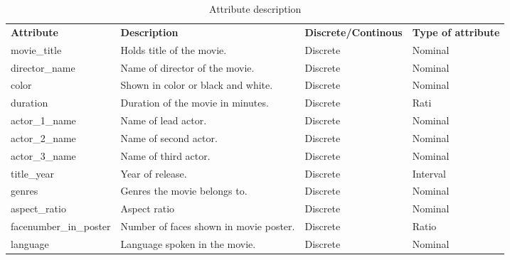 \documentclass[11pt]{article}
\begin{document}
\begin{sidewaystable}
\centering
\caption{Attribute description}
\label{my-label}
\begin{tabular}{llll}
\textbf{Attribute}           & \textbf{Description}                                  & \textbf{Discrete/Continous} & \textbf{Type of attribute} \\
movie\_title                 & Holds title of the movie.                             & Discrete                    & Nominal                    \\
director\_name               & Name of director of the movie.                        & Discrete                    & Nominal                    \\
color                        & Shown in color or black and white.                    & Discrete                    & Nominal                    \\
duration                     & Duration of the movie in minutes.                     & Discrete                    & Rati                       \\
actor\_1\_name               & Name of lead actor.                                   & Discrete                    & Nominal                    \\
actor\_2\_name               & Name of second actor.                                 & Discrete                    & Nominal                    \\
actor\_3\_name               & Name of third actor.                                  & Discrete                    & Nominal                    \\
title\_year                  & Year of release.                                      & Discrete                    & Interval                   \\
genres                       & Genres the movie belongs to.                          & Discrete                    & Nominal                    \\
aspect\_ratio                & Aspect ratio                                          & Discrete                    & Nominal                    \\
facenumber\_in\_poster       & Number of faces shown in movie poster.                & Discrete                    & Ratio                      \\
language                     & Language spoken in the movie.                         & Discrete                    & Nominal                    \\

\end{tabular}
\end{sidewaystable}
\end{document}
